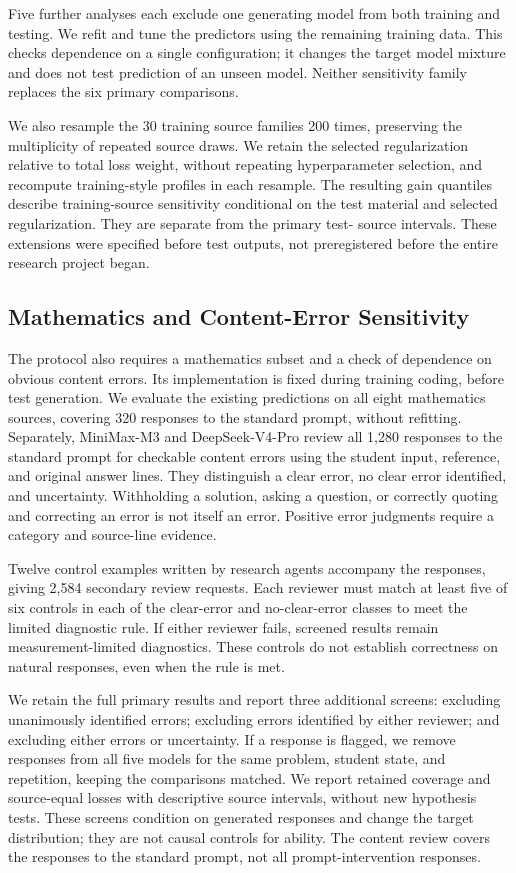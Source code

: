 Five further analyses each exclude one generating model from both training
and testing. We refit and tune the predictors using the remaining training data. This checks dependence on a single configuration;
it changes the target model mixture and does not test prediction of an unseen
model. Neither sensitivity family replaces the six primary comparisons.

We also resample the 30 training source families 200 times, preserving the
multiplicity of repeated source draws. We retain the selected regularization
relative to total loss weight, without repeating hyperparameter selection, and
recompute training-style profiles in each resample. The resulting gain quantiles
describe training-source sensitivity conditional on the test material
and selected regularization. They are separate from the primary test-
source intervals. These extensions were specified before test outputs,
not preregistered before the entire research project began.

\subsection{Mathematics and Content-Error Sensitivity}

The protocol also requires a mathematics subset and a check of dependence on
obvious content errors. Its implementation is fixed during training coding,
before test generation. We evaluate the existing predictions on all eight
mathematics sources, covering 320 responses to the standard prompt, without refitting.
Separately, MiniMax-M3 and DeepSeek-V4-Pro review all 1,280 responses to the standard prompt
for checkable content errors using the student input, reference, and original
answer lines. They distinguish a clear error, no clear error identified, and
uncertainty. Withholding a solution, asking a question, or correctly quoting
and correcting an error is not itself an error. Positive error judgments
require a category and source-line evidence.

Twelve control examples written by research agents accompany the responses, giving 2,584
secondary review requests. Each reviewer must match at least five of six
controls in each of the clear-error and no-clear-error classes to meet the
limited diagnostic rule. If either reviewer fails, screened results remain
measurement-limited diagnostics. These controls do not establish correctness
on natural responses, even when the rule is met.

We retain the full primary results and report three additional screens:
excluding unanimously identified errors; excluding errors identified by either
reviewer; and excluding either errors or uncertainty. If a response is flagged, we remove responses from all five models for the
same problem, student state, and repetition, keeping the comparisons matched. We report retained coverage and source-equal losses
with descriptive source intervals, without new hypothesis tests. These screens
condition on generated responses and change the target distribution; they are
not causal controls for ability. The content review covers the responses to the standard prompt,
not all prompt-intervention responses.

